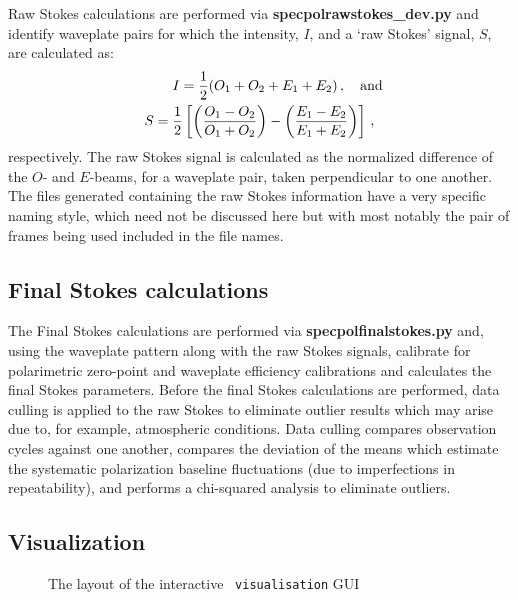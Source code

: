 Raw Stokes calculations are performed via \textbf{specpolraw\-stokes\_dev.py} and identify waveplate pairs for which the intensity, $I$, and a `raw Stokes' signal, $S$, are calculated as:
\begin{equation}
    \begin{gathered}
        I = \frac{1}{2} (O_{1} + O_{2} + E_{1} + E_{2})\,,\rlap{\quad and}\\
        S = \frac{1}{2} \left[ \left( \frac{O_{1} - O_{2}}{O_{1} + O_{2}} \right) - \left( \frac{E_{1} - E_{2}}{E_{1} + E_{2}} \right) \right]\,,
    \end{gathered}\label{eq:polsalt_rawstokes}
\end{equation}
respectively. The raw Stokes signal is calculated as the normalized difference of the $O$- and $E$-beams, for a waveplate pair, taken perpendicular to one another. The files generated containing the raw Stokes information have a very specific naming style, which need not be discussed here but with most notably the pair of frames being used included in the file names.

\subsection{Final Stokes calculations}

The Final Stokes calculations are performed via \textbf{specpolfinalstokes.py} and, using the waveplate pattern along with the raw Stokes signals, calibrate for polarimetric zero-point and waveplate efficiency calibrations and calculates the final Stokes parameters. Before the final Stokes calculations are performed, data culling is applied to the raw Stokes to eliminate outlier results which may arise due to, for example, atmospheric conditions. Data culling compares observation cycles against one another, compares the deviation of the means which estimate the systematic polarization baseline fluctuations (due to imperfections in repeatability), and performs a chi-squared analysis to eliminate outliers.

\subsection{Visualization}

\begin{figure}[t]
    \centering
    \caption{The layout of the interactive \polsalt\ \texttt{visualisation} \gls{GUI}}
    \label{fig:polsalt_gui_vis}
\end{figure}

